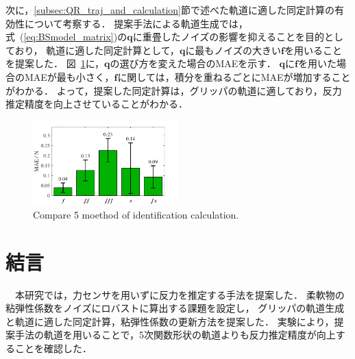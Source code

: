 \documentclass[a4paper]{jarticle}
\begin{document}
次に，\ref{subsec:QR_traj_and_calculation}節で述べた軌道に適した同定計算の有効性について考察する．
提案手法による軌道生成では，式~(\ref{eq:BSmodel_matrix})の$\mathbf{q}$に重畳したノイズの影響を抑えることを目的としており，
軌道に適した同定計算として，$\mathbf{q}$に最もノイズの大きい$\boldsymbol{f}$を用いることを提案した．
{\color{blue}
図~\ref{fig:compare_select5mode}に，$\mathbf{q}$の選び方を変えた場合のMAEを示す．
$\mathbf{q}$に$\boldsymbol{f}$を用いた場合のMAEが最も小さく，$\boldsymbol{{f}}$に関しては，積分を重ねるごとにMAEが増加することがわかる．
よって，提案した同定計算は，グリッパの軌道に適しており，反力推定精度を向上させていることがわかる．
}
\begin{figure}[t]
    \centering
    \includegraphics[width=0.5\textwidth]{select_differet_q_chicken.pdf}
    \captionsetup{width=0.9\linewidth} %
    \caption{Compare 5 moethod of identification calculation.}
    \label{fig:compare_select5mode}
\end{figure}
\section{結言}
　本研究では，力センサを用いずに反力を推定する手法を提案した．
柔軟物の粘弾性係数をノイズにロバストに算出する課題を設定し，
グリッパの軌道生成と軌道に適した同定計算，粘弾性係数の更新方法を提案した．
実験により，提案手法の軌道を用いることで，5次関数形状の軌道よりも反力推定精度が向上することを確認した．
\end{document}
